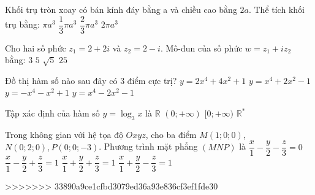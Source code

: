 \begin{ex}%
Khối trụ tròn xoay có bán kính đáy bằng a và chiều cao bằng $2{a}$. Thể tích khối trụ bằng:
\choice
{$\pi a^3$}
{$\dfrac{1}{3} \pi a^3$}
{$\dfrac{2}{3} \pi a^3$}
{\True $2\pi a^3$}

\end{ex}
\begin{ex}%
Cho hai số phức $z_1=2+2 i$ và $z_2=2-i$. Mô-đun của số phức $w=z_1+i z_2$ bằng:
\choice
{$3$}
{\True $5$}
{$\sqrt{5}$}
{$25$}

\end{ex}
\begin{ex}%
Đồ thị hàm số nào sau đây có $3$ điểm cực trị?
\choice
{$y=2 x^4+4 x^2+1$}
{$y=x^4+2 x^2-1$}
{$y=-x^4-x^2+1$}
{\True $y=x^4-2 x^2-1$}

\end{ex}
\begin{ex}%
Tập xác định của hàm số $y=\log_3 x$ là
\choice
{$\mathbb{R}$}
{\True $(0;+\infty)$}
{$[0;+\infty)$}
{$\mathbb{R}^{*}$}

\end{ex}
\begin{ex}%
Trong không gian với hệ tọa độ $O x y z$, cho ba điểm $M(1; 0; 0)$, $N(0; 2; 0), P(0; 0;-3)$. Phương trình mặt phẳng $(MNP)$ là
\choice
{$\dfrac{x}{1}-\dfrac{y}{2}-\dfrac{z}{3}=0$}
{$\dfrac{x}{1}-\dfrac{y}{2}+\dfrac{z}{3}=1$}
{$\dfrac{x}{1}+\dfrac{y}{2}+\dfrac{z}{3}=1$}
{\True $\dfrac{x}{1}+\dfrac{y}{2}-\dfrac{z}{3}=1$}

\end{ex}


>>>>>>> 33890a9ce1cfbd3079ed36a93e836cf3ef1fde30
